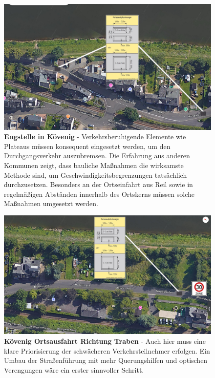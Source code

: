	\begin{figure}[H]
		\centering
		\includegraphics[width=0.8\linewidth]{"bild2"}
		\caption[Engstelle in Kövenig]{\textbf{Engstelle in Kövenig} -	Verkehrsberuhigende Elemente wie Plateaus müssen konsequent eingesetzt werden, um den Durchgangsverkehr auszubremsen. Die Erfahrung aus anderen Kommunen zeigt, dass bauliche Maßnahmen die wirksamste Methode sind, um Geschwindigkeitsbegrenzungen tatsächlich durchzusetzen. Besonders an der Ortseinfahrt aus Reil sowie in regelmäßigen Abständen innerhalb des Ortskerns müssen solche Maßnahmen umgesetzt werden. }
		\label{fig:Engstelle-Koevenig}
	\end{figure}
	
	\begin{figure}[H]
		\centering
		\includegraphics[width=0.8\linewidth]{"bild3"}
		\caption[Kövenig Ortsausfahrt Richtung Traben]{\textbf{Kövenig Ortsausfahrt Richtung Traben} - Auch hier muss eine klare Priorisierung der schwächeren Verkehrsteilnehmer erfolgen. Ein Umbau der Straßenführung mit mehr Querungshilfen und optischen Verengungen wäre ein erster sinnvoller Schritt.}
		\label{fig:Koevenig-TT}
	\end{figure}
	
